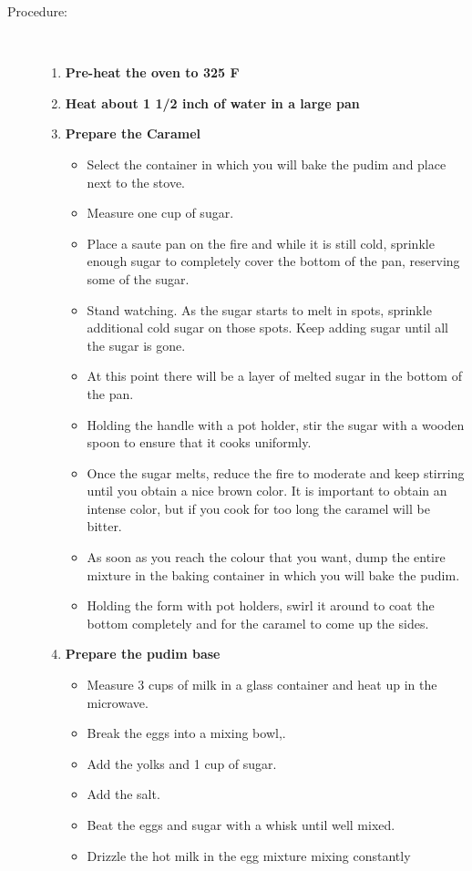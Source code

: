 \documentclass [11pt, letterpaper] {article}
\begin{document}
\begin{description}
\item[Procedure:] \ \\
	\begin{enumerate}
	\item {\bf Pre-heat the oven to 325 F}
	\item {\bf Heat about 1 1/2 inch of water in a large pan}
	\item {\bf Prepare the Caramel}
	\begin{itemize}
	\item Select the container in which you will bake the pudim and place
next to the stove.
	\item Measure one cup of sugar.
	\item Place a saute pan on the fire and while it is still
cold, sprinkle enough sugar to completely cover the bottom of the pan, reserving some of the sugar.
	\item Stand watching. As the sugar starts to melt in spots,
sprinkle additional cold sugar on those spots. Keep adding sugar until
all the sugar is gone.
	\item At this point there will be a layer of melted sugar in
the bottom of the pan. 
	\item Holding the handle with a pot holder, stir the sugar
with a wooden spoon to ensure that it cooks uniformly.
	\item Once the sugar melts, reduce the fire to moderate and
keep stirring until you obtain a nice brown color. It is important to
obtain  an intense color, but if you cook for too long the caramel will be
bitter.
	\item As soon as you reach the colour that you want, dump the
entire mixture in the baking container in which you will bake the pudim. 
	\item Holding the form with pot holders, swirl it around to
coat the bottom completely and for the caramel to come up the sides.
	\end{itemize}
	\item {\bf Prepare the pudim base}
	\begin{itemize}
	\item Measure 3 cups of milk in a glass container and
heat up in the microwave.
	\item Break the eggs into a mixing bowl,.
	\item Add the yolks and 1 cup of sugar.
	\item Add the salt.
        \item Beat the eggs and sugar with a whisk until well mixed.
	\item Drizzle the hot milk in the egg mixture mixing constantly

\end{itemize}
\end{enumerate}
\end{description}
\end{document}

